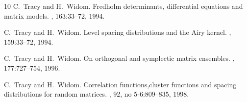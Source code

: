\documentclass[11pt]{article}
\begin{document}
\begin{thebibliography}{10}
C.~Tracy and H.~Widom.
\newblock Fredholm determinants, differential equations and matrix models.
, 163:33--72, 1994.

C.~Tracy and H.~Widom.
\newblock Level spacing distributions and the {A}iry kernel.
, 159:33--72, 1994.

C.~Tracy and H.~Widom.
\newblock On orthogonal and symplectic matrix ensembles.
, 177:727--754, 1996.

C.~Tracy and H.~Widom.
\newblock Correlation functions,cluster functions and spacing distributions for
  random matrices.
, 92, no 5-6:809--835, 1998.

\end{thebibliography}



%
%
%
\end{document}
